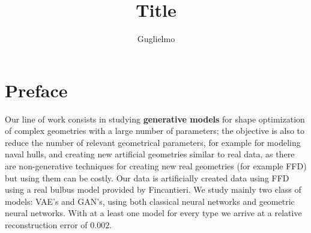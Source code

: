 \documentclass{article}
\title{Title}
\author{Guglielmo}
\begin{document}
\maketitle

\section{Preface}
 Our line of work consists in studying \textbf{generative models} for shape optimization of complex geometries with a large number of parameters; the objective is also to reduce the number of relevant geometrical parameters, for example for modeling naval hulls, and creating new artificial geometries similar to real data, as there are non-generative techniques for creating new real geometries (for example FFD) but using them can be costly. Our data is artificially created data using FFD using a real bulbus model provided by Fincantieri. We study mainly two class of models: VAE's and GAN's, using both classical neural networks and geometric neural networks. With at a least one model for every type we arrive at a relative reconstruction error of $0.002$.
\end{document}

